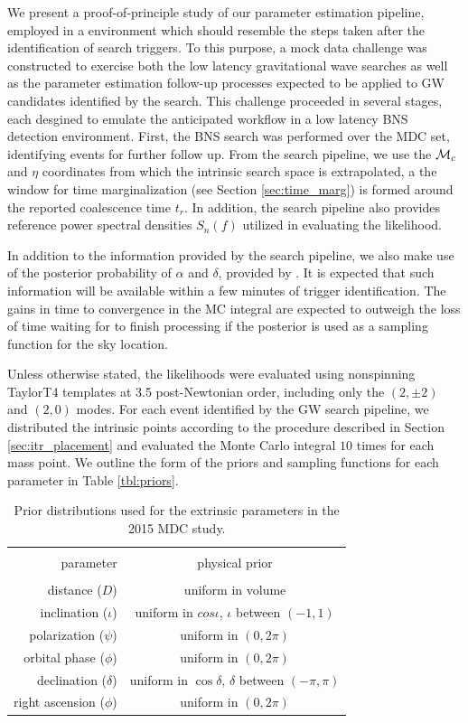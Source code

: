 \label{sec:Results}

We present a proof-of-principle study of our parameter estimation pipeline, employed in a environment which should resemble the steps taken after the identification of search triggers. To this purpose, a mock data challenge was constructed to exercise both the low latency gravitational wave searches as well as the parameter estimation follow-up processes expected to be applied to GW candidates identified by the search. This challenge proceeded in several stages, each desgined to emulate the anticipated workflow in a low latency BNS detection environment. First, the \gstlal{} BNS search was performed over the MDC set, identifying events for further follow up. From the search pipeline, we use the ${{\cal M}_c}$ and $\eta$ coordinates from which the intrinsic search space is extrapolated, a the window for time marginalization (see Section \ref{sec:time_marg}) is formed around the reported coalescence time $t_r$. In addition, the search pipeline also provides reference power spectral densities $S_n(f)$ utilized in evaluating the likelihood.

In addition to the information provided by the search pipeline, we also make use of the posterior probability of $\alpha$ and $\delta$, provided by \BS. It is expected that such information will be available within a few minutes of trigger identification. The gains in time to convergence in the MC integral are expected to outweigh the loss of time waiting for \BS to finish processing if the \BS posterior is used as a sampling function for the sky location.

%
Unless otherwise stated, the likelihoods were evaluated using nonspinning TaylorT4 templates at 3.5 post-Newtonian order, including only the $(2,\pm 2)$ and $(2,0)$ modes. For each event identified by the GW search pipeline, we distributed the intrinsic points according to the procedure described in Section \ref{sec:itr_placement} and evaluated the Monte Carlo integral $10$ times for each mass point. We outline the form of the priors and sampling functions for each parameter in Table \ref{tbl:priors}.

\begin{table}
\begin{tabular}{r|c}
\hline \\
parameter & physical prior \\
\hline \\
distance ($D$) & uniform in volume \\
inclination ($\iota$) & uniform in $cos\iota$, $\iota$ between $(-1, 1)$ \\
polarization ($\psi$) & uniform in $(0, 2\pi)$ \\
orbital phase ($\phi$) & uniform in $(0, 2\pi)$ \\
declination ($\delta$) & uniform in $\cos\delta$, $\delta$ between $(-\pi, \pi)$ \\
right ascension ($\phi$) & uniform in $(0, 2\pi)$ \\
\hline
\end{tabular}
\caption{Prior distributions used for the extrinsic parameters in the 2015 MDC study.}
\end{table}

